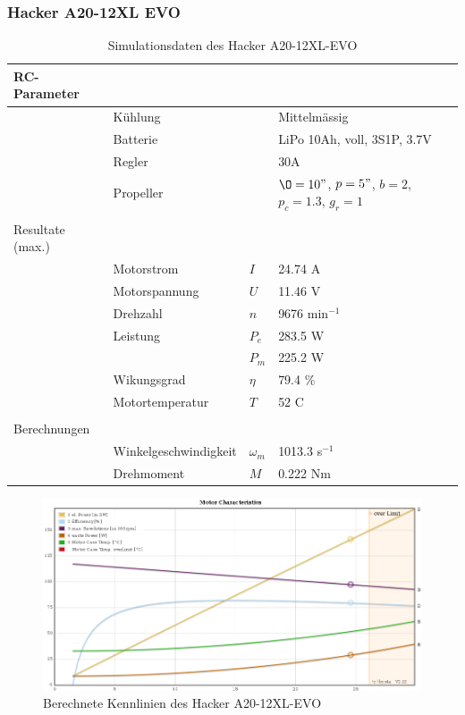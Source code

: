 \subsubsection*{Hacker A20-12XL EVO}

\begin{table}[h!]
	\centering
	\begin{tabular}{l l l l}
		RC-Parameter & & & \\ \hline
			& Kühlung	& & Mittelmässig \\
			& Batterie	& & LiPo 10Ah, voll, 3S1P, 3.7V \\
			& Regler	& & 30A \\
			& Propeller	& & $\O=10"$, $p=5"$, $b=2$, $p_c=1.3$, $g_r=1$ \\
			& & & \\
		Resultate (max.) & & & \\ \hline
			& Motorstrom	& $I$	& 24.74 A \\
			& Motorspannung	& $U$	& 11.46 V \\
			& Drehzahl	& $n$	& 9676 min$^{-1}$ \\
			& Leistung 	& $P_e$	& 283.5 W \\
			&		& $P_m$	& 225.2 W \\
			& Wikungsgrad	& $\eta$& 79.4 \% \\
			& Motortemperatur
					& $T$	& 52 C \\
			& & & \\
		Berechnungen & & & \\ \hline
			& Winkelgeschwindigkeit
					& $\omega_m$	& 1013.3 s$^{-1}$ \\
			& Drehmoment	& $M$		& 0.222 Nm
	\end{tabular}
	\caption{Simulationsdaten des Hacker A20-12XL-EVO}
\end{table}

\begin{figure}[h!]
	\centering
	\includegraphics[width=1\textwidth]{../../fig/motor/ecalc_A20-12XL-EVO.png}
	\caption{Berechnete Kennlinien des Hacker A20-12XL-EVO}
	\label{fig:ecalc_A20-12XL-EVO}
\end{figure}
